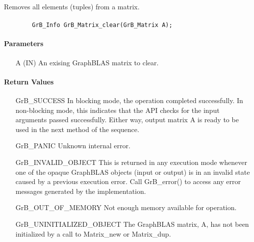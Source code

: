 Removes all elements (tuples) from a matrix.

\paragraph{\syntax}

\begin{verbatim}
        GrB_Info GrB_Matrix_clear(GrB_Matrix A);
\end{verbatim}

\paragraph{Parameters}

\begin{itemize}[leftmargin=1.1in]
    \item[{\sf A}] ({\sf IN}) An exising GraphBLAS matrix to clear.
\end{itemize}

\paragraph{Return Values}

\begin{itemize}[leftmargin=2.1in]
    \item[{\sf GrB\_SUCCESS}]         In blocking mode, the operation completed
    successfully. In non-blocking mode, this indicates that the API checks 
    for the input arguments passed successfully. Either way, output matrix 
    {\sf A} is ready to be used in the next method of the sequence.

    \item[{\sf GrB\_PANIC}]           Unknown internal error.
    
    \item[{\sf GrB\_INVALID\_OBJECT}] This is returned in any execution mode 
    whenever one of the opaque GraphBLAS objects (input or output) is in an invalid 
    state caused by a previous execution error.  Call {\sf GrB\_error()} to access 
    any error messages generated by the implementation.

    \item[{\sf GrB\_OUT\_OF\_MEMORY}] Not enough memory available for operation.
    
    \item[{\sf GrB\_UNINITIALIZED\_OBJECT}]  The GraphBLAS matrix, {\sf *A}, has 
    not been initialized by a call to {\sf Matrix\_new} or {\sf Matrix\_dup}.
    
\end{itemize}

